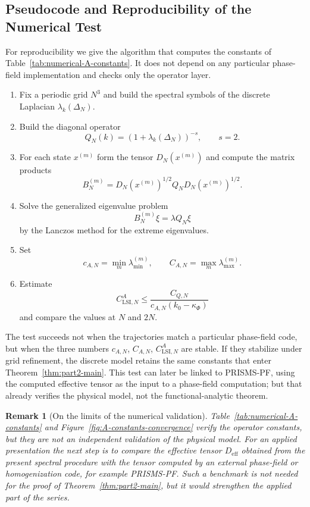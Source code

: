 \documentclass{article}
\newtheorem{remark}[theorem]{Remark}
\begin{document}
\subsection{Pseudocode and Reproducibility of the Numerical Test}

For reproducibility we give the algorithm that computes the constants of
Table~\ref{tab:numerical-A-constants}. It does not depend on any particular
phase-field implementation and checks only the operator layer.

\begin{enumerate}
\item Fix a periodic grid \(N^3\) and build the spectral symbols of the discrete
Laplacian \(\lambda_k(\Delta_N)\).
\item Build the diagonal operator
\[
        Q_N(k)=(1+\lambda_k(\Delta_N))^{-s},\qquad s=2.
\]
\item For each state \(x^{(m)}\) form the tensor \(D_N(x^{(m)})\) and compute the
matrix products
\[
        B_N^{(m)}=D_N(x^{(m)})^{1/2}Q_ND_N(x^{(m)})^{1/2}.
\]
\item Solve the generalized eigenvalue problem
\[
        B_N^{(m)}\xi=\lambda Q_N\xi
\]
by the Lanczos method for the extreme eigenvalues.
\item Set
\[
        c_{A,N}=\min_m\lambda_{\min}^{(m)},\qquad
        C_{A,N}=\max_m\lambda_{\max}^{(m)}.
\]
\item Estimate
\[
        C_{\mathrm{LSI},N}^A
        \le
        \frac{C_{Q,N}}{c_{A,N}(k_0-\kappa_\Phi)}
\]
and compare the values at \(N\) and \(2N\).
\end{enumerate}

The test succeeds not when the trajectories match a particular phase-field code,
but when the three numbers \(c_{A,N}\), \(C_{A,N}\), \(C_{\mathrm{LSI},N}^A\) are
stable. If they stabilize under grid refinement, the discrete model retains the
same constants that enter Theorem~\ref{thm:part2-main}. This test can later be
linked to PRISMS-PF, using the computed effective tensor as the input to a
phase-field computation; but that already verifies the physical model, not the
functional-analytic theorem.



\begin{remark}[On the limits of the numerical validation]
Table~\ref{tab:numerical-A-constants} and Figure~\ref{fig:A-constants-convergence}
verify the operator constants, but they are not an independent validation of the
physical model. For an applied presentation the next step is to compare the
effective tensor \(D_{\mathrm{eff}}\) obtained from the present spectral procedure
with the tensor computed by an external phase-field or homogenization code, for
example PRISMS-PF. Such a benchmark is not needed for the proof of
Theorem~\ref{thm:part2-main}, but it would strengthen the applied part of the
series.
\end{remark}
\end{document}

